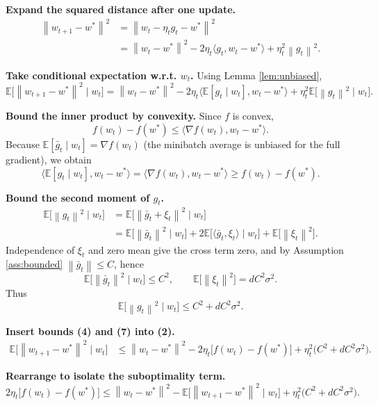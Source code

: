 \documentclass[11pt]{article}
\newcommand{\E}{\mathbb{E}}
\newcommand{\norm}[1]{\left\lVert#1\right\rVert}
\newcommand{\ip}[2]{\langle #1,#2\rangle}
\newcommand{\grad}{\nabla}
\begin{document}
\begin{enumerate}[label={[\textbf{Step \arabic*}]}]
\item \textbf{Expand the squared distance after one update.}
\[
\begin{aligned}
\norm{w_{t+1}-w^{*}}^{2}
&=\norm{w_t-\eta_t g_t-w^{*}}^{2}\\
&=\norm{w_t-w^{*}}^{2}
-2\eta_t\ip{g_t}{w_t-w^{*}}
+\eta_t^{2}\norm{g_t}^{2}.
\end{aligned}
\tag{1}
\]

\item \textbf{Take conditional expectation w.r.t. $w_t$.} Using Lemma \ref{lem:unbiased},
\[
\E\!\bigl[\norm{w_{t+1}-w^{*}}^{2}\mid w_t\bigr]
= \norm{w_t-w^{*}}^{2}
-2\eta_t\ip{\E[g_t\mid w_t]}{w_t-w^{*}}
+\eta_t^{2}\E\!\bigl[\norm{g_t}^{2}\mid w_t\bigr].
\tag{2}
\]

\item \textbf{Bound the inner product by convexity.} Since $f$ is convex,
\[
f(w_t)-f(w^{*})\le \ip{\grad f(w_t)}{w_t-w^{*}}.
\tag{3}
\]
Because $\E[\bar g_t\mid w_t]=\grad f(w_t)$ (the minibatch average is unbiased for the full gradient), we obtain
\[
\ip{\E[g_t\mid w_t]}{w_t-w^{*}}=\ip{\grad f(w_t)}{w_t-w^{*}}
\ge f(w_t)-f(w^{*}).
\tag{4}
\]

\item \textbf{Bound the second moment of $g_t$.}
\[
\begin{aligned}
\E\!\bigl[\norm{g_t}^{2}\mid w_t\bigr]
&= \E\!\bigl[\norm{\bar g_t+\xi_t}^{2}\mid w_t\bigr] \\
&= \E\!\bigl[\norm{\bar g_t}^{2}\mid w_t\bigr]
+2\E\!\bigl[\ip{\bar g_t}{\xi_t}\mid w_t\bigr]
+\E\!\bigl[\norm{\xi_t}^{2}\bigr] .
\end{aligned}
\tag{5}
\]
Independence of $\xi_t$ and zero mean give the cross term zero, and by Assumption \ref{ass:bounded} $\norm{\bar g_t}\le C$, hence
\[
\E\!\bigl[\norm{\bar g_t}^{2}\mid w_t\bigr]\le C^{2},\qquad
\E\!\bigl[\norm{\xi_t}^{2}\bigr]=dC^{2}\sigma^{2}.
\tag{6}
\]
Thus
\[
\E\!\bigl[\norm{g_t}^{2}\mid w_t\bigr]\le C^{2}+dC^{2}\sigma^{2}.
\tag{7}
\]

\item \textbf{Insert bounds (4) and (7) into (2).}
\[
\begin{aligned}
\E\!\bigl[\norm{w_{t+1}-w^{*}}^{2}\mid w_t\bigr]
&\le \norm{w_t-w^{*}}^{2}
-2\eta_t\bigl[f(w_t)-f(w^{*})\bigr]
+\eta_t^{2}\bigl(C^{2}+dC^{2}\sigma^{2}\bigr).
\end{aligned}
\tag{8}
\]

\item \textbf{Rearrange to isolate the suboptimality term.}
\[
2\eta_t\bigl[f(w_t)-f(w^{*})\bigr]
\le \norm{w_t-w^{*}}^{2}
-\E\!\bigl[\norm{w_{t+1}-w^{*}}^{2}\mid w_t\bigr]
+\eta_t^{2}\bigl(C^{2}+dC^{2}\sigma^{2}\bigr).
\tag{9}
\]


\end{enumerate}
\end{document}

